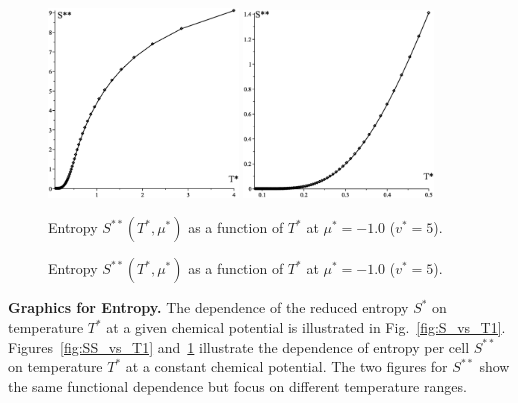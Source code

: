 \documentclass[12pt]{article}
\numberwithin{equation}{section}
\begin{document}
	\begin{figure}[htbp]
		\includegraphics[width=0.45\textwidth,angle=0]{SS_vs_T1}
		\hfill
		\includegraphics[width=0.45\textwidth,angle=0]{SS_vs_T2}
		\\
		\parbox{0.45\textwidth}{\caption{\label{fig:SS_vs_T1} Entropy $S^{**}(T^*,\mu^*)$ as a function of $T^*$ at $\mu^*=-1.0$ ($v^* = 5$).}}
		\hfill
		\parbox{0.45\textwidth}{\caption{\label{fig:SS_vs_T2} Entropy $S^{**}(T^*,\mu^*)$ as a function of $T^*$ at $\mu^*=-1.0$ ($v^* = 5$).}}
	\end{figure}
	
	\textbf{Graphics for Entropy.} The dependence of the reduced entropy $S^*$ on temperature $T^*$ at a given chemical potential is illustrated in Fig.~\ref{fig:S_vs_T1}. Figures~\ref{fig:SS_vs_T1} and~\ref{fig:SS_vs_T2} illustrate the dependence of entropy per cell $S^{**}$ on temperature $T^*$ at a constant chemical potential. The two figures for $S^{**}$ show the same functional dependence but focus on different temperature ranges.
	
\end{document}
